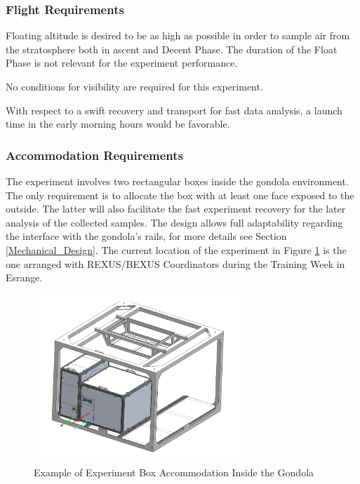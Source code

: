 \documentclass[a4paper,12pt,twoside]{article}
\providecommand{\DIFaddtex}[1]{{\protect\color{blue}\uwave{#1}}} %
\providecommand{\DIFdelbegin}{} %
\providecommand{\DIFaddFL}[1]{\DIFadd{#1}} %
\providecommand{\DIFaddbeginFL}{} %
\providecommand{\DIFaddendFL}{} %
\providecommand{\DIFdelbeginFL}{} %
\providecommand{\DIFdelendFL}{} %
\providecommand{\DIFadd}[1]{\texorpdfstring{\DIFaddtex{#1}}{#1}} %
\newcommand{\DIFscaledelfig}{0.5}
\newlength{\DIFdelgraphicswidth} %
\newlength{\DIFdelgraphicsheight} %
\newcommand{\DIFaddincludegraphics}[2][]{{\color{blue}\fbox{\DIFOincludegraphics[#1]{#2}}}} %
\newcommand{\DIFdelincludegraphics}[2][]{%
\sbox{\DIFdelgraphicsbox}{\DIFOincludegraphics[#1]{#2}}%
\settoboxwidth{\DIFdelgraphicswidth}{\DIFdelgraphicsbox} %
\settoboxtotalheight{\DIFdelgraphicsheight}{\DIFdelgraphicsbox} %
\scalebox{\DIFscaledelfig}{%
\parbox[b]{\DIFdelgraphicswidth}{\usebox{\DIFdelgraphicsbox}\\[-\baselineskip] \rule{\DIFdelgraphicswidth}{0em}}\llap{\resizebox{\DIFdelgraphicswidth}{\DIFdelgraphicsheight}{%
\setlength{\unitlength}{\DIFdelgraphicswidth}%
\begin{picture}(1,1)%
\thicklines\linethickness{2pt} %
{\color[rgb]{1,0,0}\put(0,0){\framebox(1,1){}}}%
{\color[rgb]{1,0,0}\put(0,0){\line( 1,1){1}}}%
{\color[rgb]{1,0,0}\put(0,1){\line(1,-1){1}}}%
\end{picture}%
}\hspace*{3pt}}} %
} %
\DeclareRobustCommand{\DIFdelbegin}{\DIFOdelbegin \let\includegraphics\DIFdelincludegraphics} %
\DeclareRobustCommand{\DIFaddbeginFL}{\DIFOaddbeginFL \let\includegraphics\DIFaddincludegraphics} %
\DeclareRobustCommand{\DIFaddendFL}{\DIFOaddendFL \let\includegraphics\DIFOincludegraphics} %
\DeclareRobustCommand{\DIFdelbeginFL}{\DIFOdelbeginFL \let\includegraphics\DIFdelincludegraphics} %
\DeclareRobustCommand{\DIFdelendFL}{\DIFOaddendFL \let\includegraphics\DIFOincludegraphics} %
\begin{document}
\subsubsection{Flight Requirements}

Floating altitude is desired to be as high as possible in order to sample air from the stratosphere both in ascent and Decent Phase. The duration of the Float Phase is not relevant for the experiment performance. 

\smallskip
No conditions for visibility are required for this experiment.

\smallskip
With respect to a swift recovery and transport for fast data analysis, a launch time in the early morning hours would be favorable.

\pagebreak
\subsubsection{Accommodation Requirements}

The experiment involves two rectangular boxes inside the gondola environment. The only requirement is to allocate the box with at least one face exposed to the outside. The latter will also facilitate the fast experiment recovery for the later analysis of the collected samples. The design allows full adaptability regarding the interface with the gondola's rails, for more details see Section \ref{Mechanical_Design}. The current location of the experiment in Figure \ref{goldola_accommodation} is the one arranged with REXUS/BEXUS Coordinators during the Training Week in Esrange.

\DIFdelbegin %
\DIFdelendFL \DIFaddbeginFL \begin{figure}[H]
    \DIFaddendFL \centering
    \DIFdelbeginFL %
\DIFdelendFL \DIFaddbeginFL \includegraphics[width=0.7\textwidth]{6-launch-campaign-preparation/img/Gondola_Placement.PNG}
    \DIFaddendFL \caption{Example of Experiment Box Accommodation Inside the Gondola\DIFaddbeginFL \DIFaddFL{.}\DIFaddendFL }
    \label{goldola_accommodation}
\end{figure}
\pagebreak
\end{document}
